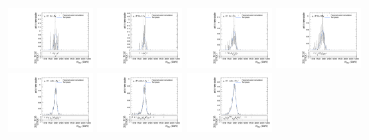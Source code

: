 \begin{figure}[htpb]
  \centering
  \includegraphics[width=0.2\textwidth]{fig/analysisAppendix/templateVsReco_VBFZprToWW2000_r0_MVV_mu_HP_bb_LDy_linear.pdf}
  \includegraphics[width=0.2\textwidth]{fig/analysisAppendix/templateVsReco_VBFZprToWW2000_r0_MVV_mu_LP_bb_LDy_linear.pdf}
  \includegraphics[width=0.2\textwidth]{fig/analysisAppendix/templateVsReco_VBFZprToWW2000_r0_MVV_mu_HP_bb_HDy_linear.pdf}
  \includegraphics[width=0.2\textwidth]{fig/analysisAppendix/templateVsReco_VBFZprToWW2000_r0_MVV_mu_LP_bb_HDy_linear.pdf}\\
  \includegraphics[width=0.2\textwidth]{fig/analysisAppendix/templateVsReco_VBFZprToWW2000_r0_MVV_mu_HP_nobb_LDy_linear.pdf}
  \includegraphics[width=0.2\textwidth]{fig/analysisAppendix/templateVsReco_VBFZprToWW2000_r0_MVV_mu_LP_nobb_LDy_linear.pdf}
  \includegraphics[width=0.2\textwidth]{fig/analysisAppendix/templateVsReco_VBFZprToWW2000_r0_MVV_mu_HP_nobb_HDy_linear.pdf}

\end{figure}

